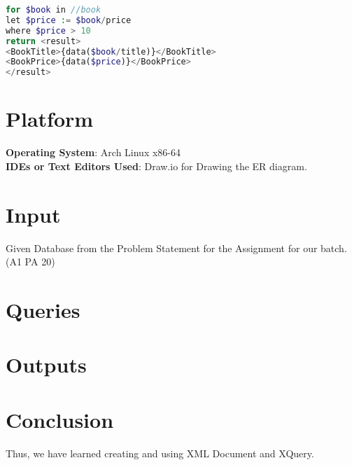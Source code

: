 \documentclass[11pt]{article}
\begin{document}
\begin{lstlisting}[language=php]
for $book in //book
let $price := $book/price
where $price > 10
return <result>
<BookTitle>{data($book/title)}</BookTitle>
<BookPrice>{data($price)}</BookPrice>
</result>    
\end{lstlisting}

\section{Platform}
\textbf{Operating System}: Arch Linux x86-64 \\
\textbf{IDEs or Text Editors Used}: Draw.io for Drawing the ER diagram. \\


\section{Input}
Given Database from the Problem Statement for the Assignment for our batch. (A1 PA 20)

\section{Queries}
% 

\section{Outputs}
% 

\section{Conclusion}
Thus, we have learned creating and using XML Document and XQuery.

\clearpage
\end{document}
